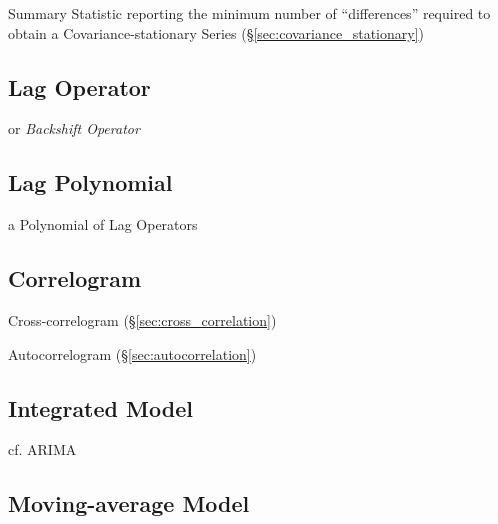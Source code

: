 Summary Statistic reporting the minimum number of ``differences'' required to
obtain a Covariance-stationary Series (\S\ref{sec:covariance_stationary})



\subsection{Lag Operator}\label{sec:lag_operator}

or \emph{Backshift Operator}



\subsection{Lag Polynomial}\label{sec:lag_polynomial}

a Polynomial of Lag Operators



\subsection{Correlogram}\label{sec:correlogram}

Cross-correlogram (\S\ref{sec:cross_correlation})

Autocorrelogram (\S\ref{sec:autocorrelation})



\subsection{Integrated Model}\label{sec:integrated_model}

cf. ARIMA



\subsection{Moving-average Model}\label{sec:moving_average_model}

